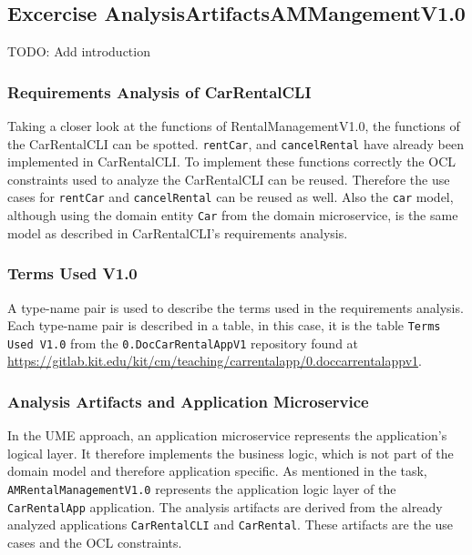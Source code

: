 \subsection{Excercise AnalysisArtifactsAMMangementV1.0}
TODO: Add introduction
\subsubsection*{Requirements Analysis of CarRentalCLI}
Taking a closer look at the functions of RentalManagementV1.0, the functions of the CarRentalCLI can be spotted.
\texttt{rentCar}, and \texttt{cancelRental} have already been implemented in CarRentalCLI.
To implement these functions correctly the OCL constraints used to analyze the CarRentalCLI can be reused.
Therefore the use cases for \texttt{rentCar} and \texttt{cancelRental} can be reused as well.
Also the \texttt{car} model, although using the domain entity \texttt{Car} from the domain microservice, is the same model as described in CarRentalCLI's requirements analysis.
\subsubsection*{Terms Used V1.0}
A type-name pair is used to describe the terms used in the requirements analysis.
Each type-name pair is described in a table, in this case, it is the table \texttt{Terms Used V1.0} from the \texttt{0.DocCarRentalAppV1} repository found at \url{https://gitlab.kit.edu/kit/cm/teaching/carrentalapp/0.doccarrentalappv1}.

\subsubsection*{Analysis Artifacts and Application Microservice}
In the UME approach, an application microservice represents the application's logical layer.
It therefore implements the business logic, which is not part of the domain model and therefore application specific.
As mentioned in the task, \texttt{AMRentalManagementV1.0} represents the application logic layer of the \texttt{CarRentalApp} application.
The analysis artifacts are derived from the already analyzed applications \texttt{CarRentalCLI} and \texttt{CarRental}.
These artifacts are the use cases and the OCL constraints.

